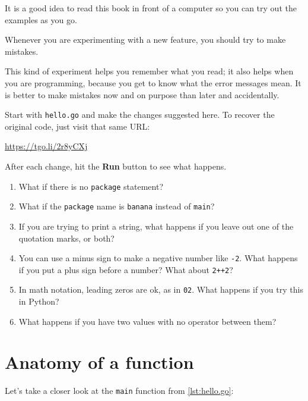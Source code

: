 \begin{exercise}

It is a good idea to read this book in front of a computer so you can try out
the examples as you go.

Whenever you are experimenting with a new feature, you should try to make
mistakes. 

This kind of experiment helps you remember what you read; it also
helps when you are programming, because you get to know what the error
messages mean. It is better to make mistakes now and on purpose than
later and accidentally.

Start with {\tt hello.go} and make the changes suggested here. To recover
the original code, just visit that same URL:

\url{https://tgo.li/2r8yCXj}

After each change, hit the {\bf Run} button to see what happens.

\begin{enumerate}

\item What if there is no {\tt package} statement?

\item What if the {\tt package} name is {\tt banana} instead of {\tt main}? 

\item If you are trying to print a string, what happens if you
leave out one of the quotation marks, or both?

\item You can use a minus sign to make a negative number like
{\tt -2}. What happens if you put a plus sign before a number?
What about {\tt 2++2}?

\item In math notation, leading zeros are ok, as in {\tt 02}.
What happens if you try this in Python?

\item What happens if you have two values with no operator
between them?

\end{enumerate}

\end{exercise}


\section{Anatomy of a function}
\label{function!syntax}

Let's take a closer look at the {\tt main} function from \ref{lst:hello.go}:

